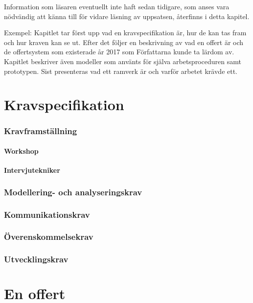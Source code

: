 Information som läsaren eventuellt inte haft sedan tidigare, som anses vara nödvändig att känna till för vidare läsning av uppsatsen, återfinns i detta kapitel. 

Exempel: Kapitlet tar först upp vad en kravspecifikation är, hur de kan tas fram och hur kraven kan se ut. Efter det följer en beskrivning av vad en offert är och de offertsystem som existerade år 2017 som Författarna kunde ta lärdom av. Kapitlet beskriver även modeller som använts för själva arbetsproceduren samt prototypen. Sist presenteras vad ett ramverk är och varför arbetet krävde ett. 

\section{Kravspecifikation}

\subsubsection{Kravframställning} 

\paragraph{Workshop}

\paragraph{Intervjutekniker}

\subsubsection{Modellering- och analyseringskrav}


\subsubsection{Kommunikationskrav}


\subsubsection{Överenskommelsekrav}


\subsubsection{Utvecklingskrav}


\section{En offert}\label{sec:offert}

